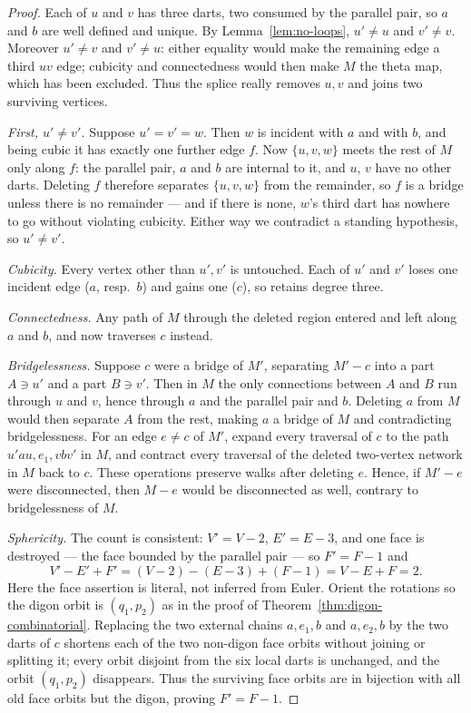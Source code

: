 \begin{proof}
Each of $u$ and $v$ has three darts, two consumed by the parallel pair, so
$a$ and $b$ are well defined and unique. By Lemma~\ref{lem:no-loops},
$u' \neq u$ and $v' \neq v$.
Moreover $u'\neq v$ and $v'\neq u$: either equality would make the remaining
edge a third $uv$ edge; cubicity and connectedness would then make $M$ the
theta map, which has been excluded. Thus the splice really removes $u,v$ and
joins two surviving vertices.

\emph{First, $u' \neq v'$.} Suppose $u' = v' = w$. Then $w$ is incident with
$a$ and with $b$, and being cubic it has exactly one further edge $f$. Now
$\{u,v,w\}$ meets the rest of $M$ only along $f$: the parallel pair, $a$ and
$b$ are internal to it, and $u$, $v$ have no other darts. Deleting $f$
therefore separates $\{u,v,w\}$ from the remainder, so $f$ is a bridge
unless there is no remainder --- and if there is none, $w$'s third dart has
nowhere to go without violating cubicity. Either way we contradict a
standing hypothesis, so $u' \neq v'$.

\emph{Cubicity.} Every vertex other than $u',v'$ is untouched. Each of $u'$
and $v'$ loses one incident edge ($a$, resp.\ $b$) and gains one ($c$), so
retains degree three.

\emph{Connectedness.} Any path of $M$ through the deleted region entered and
left along $a$ and $b$, and now traverses $c$ instead.

\emph{Bridgelessness.} Suppose $c$ were a bridge of $M'$, separating $M'-c$
into a part $A \ni u'$ and a part $B \ni v'$. Then in $M$ the only
connections between $A$ and $B$ run through $u$ and $v$, hence through $a$
and the parallel pair and $b$. Deleting $a$ from $M$ would then separate
$A$ from the rest, making $a$ a bridge of $M$ and contradicting
bridgelessness. For an edge $e\neq c$ of $M'$, expand every traversal of $c$
to the path $u' a u,e_1,v b v'$ in $M$, and contract every traversal of the
deleted two-vertex network in $M$ back to $c$. These operations preserve
walks after deleting $e$. Hence, if $M'-e$ were disconnected, then $M-e$
would be disconnected as well, contrary to bridgelessness of $M$.

\emph{Sphericity.} The count is consistent: $V' = V-2$, $E' = E-3$, and one
face is destroyed --- the face bounded by the parallel pair --- so
$F' = F-1$ and
\[
  V' - E' + F' = (V-2)-(E-3)+(F-1) = V - E + F = 2 .
\]
Here the face assertion is literal, not inferred from Euler.  Orient the
rotations so the digon orbit is $(q_1,p_2)$ as in the proof of
Theorem~\ref{thm:digon-combinatorial}.  Replacing the two external chains
$a,e_1,b$ and $a,e_2,b$ by the two darts of $c$ shortens each of the two
non-digon face orbits without joining or splitting it; every orbit disjoint
from the six local darts is unchanged, and the orbit $(q_1,p_2)$ disappears.
Thus the surviving face orbits are in bijection with all old face orbits but
the digon, proving $F'=F-1$.


\end{proof}
